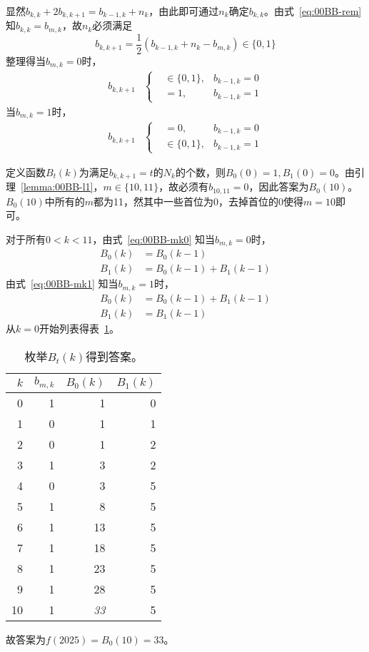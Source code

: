 显然$b_{k, k} + 2b_{k, k + 1} = b_{k - 1, k} + n_k$，由此即可通过$n_k$确定$b_{k, k}$。由式~\ref{eq:00BB-rem} 知$b_{k, k} = b_{m, k}$，故$n_k$必须满足
\[ b_{k, k + 1} = \frac12\left(b_{k - 1, k} + n_k - b_{m, k}\right) \in\{0, 1\} \]
整理得当$b_{m, k} = 0$时，
\begin{align}
  b_{k, k + 1} &\left\{\begin{aligned}
    &\in\{0, 1\}, & b_{k - 1, k} = 0 \\
    &= 1, & b_{k - 1, k} = 1
  \end{aligned}\right. \label{eq:00BB-mk0}
\end{align}
当$b_{m, k} = 1$时，
\begin{align}
  b_{k, k + 1} &\left\{\begin{aligned}
    &= 0, & b_{k - 1, k} = 0 \\
    &\in\{0, 1\}, & b_{k - 1, k} = 1
  \end{aligned}\right. \label{eq:00BB-mk1}
\end{align}

定义函数$B_t(k)$为满足$b_{k, k + 1} = t$的$N_k$的个数，则$B_0(0) = 1, B_1(0) = 0$。由引理~\ref{lemma:00BB-l1}，$m \in\{10, 11\}$，故必须有$b_{10, 11} = 0$，因此答案为$B_0(10)$。$B_0(10)$中所有的$m$都为11，然其中一些首位为0，去掉首位的0使得$m = 10$即可。

对于所有$0 < k < 11$，由式~\ref{eq:00BB-mk0} 知当$b_{m, k} = 0$时，
\begin{align*}
  B_0(k) &= B_0(k - 1) \\ B_1(k) &= B_0(k - 1) + B_1(k - 1)
\end{align*}
由式~\ref{eq:00BB-mk1} 知当$b_{m, k} = 1$时，
\begin{align*}
  B_0(k) &= B_0(k - 1) + B_1(k - 1) \\ B_1(k) &= B_1(k - 1)
\end{align*}
从$k = 0$开始列表得表~\ref{tab:00BB-btk}。
\newpage

\begin{table}[htbp]
  \centering
  \begin{tabular}{rrrr}
    \toprule
    $k$ & $b_{m, k}$ & $B_0(k)$ & $B_1(k)$ \\ \midrule
     0 & 1 &  1 & 0 \\
     1 & 0 &  1 & 1 \\
     2 & 0 &  1 & 2 \\
     3 & 1 &  3 & 2 \\
     4 & 0 &  3 & 5 \\
     5 & 1 &  8 & 5 \\
     6 & 1 & 13 & 5 \\
     7 & 1 & 18 & 5 \\
     8 & 1 & 23 & 5 \\
     9 & 1 & 28 & 5 \\
    10 & 1 & \emph{33} & 5 \\ \bottomrule
  \end{tabular}
  \caption{枚举$B_t(k)$得到答案。} \label{tab:00BB-btk}
\end{table}

故答案为$f(2025) = B_0(10) = 33$。
